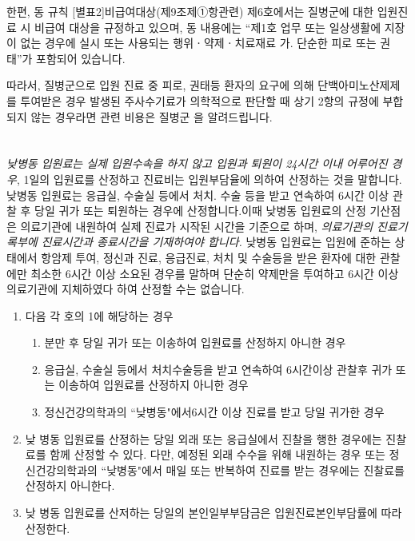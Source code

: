 {{한편, 동 규칙 [별표2]비급여대상(제9조제①항관련) 제6호에서는 질병군에 대한 입원진료 시 비급여 대상을 규정하고 있으며, 동 내용에는 “제1호 업무 또는 일상생활에 지장이 없는 경우에 실시 또는 사용되는 행위ㆍ약제ㆍ치료재료 가. 단순한 피로 또는 권태”가 포함되어 있습니다.

따라서, 질병군으로 입원 진료 중 피로, 권태등 환자의 요구에 의해 단백아미노산제제를 투여받은 경우 발생된 주사수기료가 의학적으로 판단할 때 상기 2항의 규정에 부합되지 않는 경우라면 관련 비용은 질병군 을 알려드립니다.}

\clearpage

\section{}
\emph{낮병동 입원료는 실제 입원수속을 하지 않고 입원과 퇴원이 24시간 이내 어루어진 경우}, 1일의 입원료를 산정하고 진료비는 입원부담율에 의하여 산정하는 것을 말합니다.
낮병동 입원료는 응급실, 수술실 등에서 처치. 수술 등을 받고 연속하여 6시간 이상 관찰 후 당일 귀가 또는 퇴원하는 경우에 산정합니다.이때 낮병동 입원료의 산정 기산점은 의료기관에 내원하여 실제 진료가 시작된 시간을 기준으로 하며, \emph{의료기관의 진료기록부에 진료시간과 종료시간을 기재하여야 합니다.}
낮병동 입원료는 입원에 준하는 상태에서 항암제 투여, 정신과 진료, 응급진료, 처치 및 수술등을 받은 환자에 대한 관찰에만 최소한 6시간 이상 소요된 경우를 말하며 단순히 약제만을 투여하고 6시간 이상 의료기관에 지체하였다 하여 산정할 수는 없습니다.
\begin{enumerate}[(가)]\tightlist
\item 다음 각 호의 1에 해당하는 경우
	\begin{mdframed}[linecolor=blue,middlelinewidth=2]	
	\begin{enumerate}\tightlist
	\item 분만 후 당일 귀가 또는 이송하여 입원료를 산정하지 아니한 경우
	\item 응급실, 수술실 등에서 처치\cntrdot{}수술등을 받고 연속하여 6시간이상 관찰후 귀가 또는 이송하여 입원료를 산정하지 아니한 경우
	\item 정신건강의학과의 ``낮병동"에서6시간 이상 진료를 받고 당일 귀가한 경우
	\end{enumerate}
	\end{mdframed}
\item 낮 병동 입원료를 산정하는 당일 외래 또는 응급실에서 진찰을 행한 경우에는 진찰료를 함께 산정할 수 있다. 다만, 예정된 외래 수수을 위해 내원하는 경우 또는 정신건강의학과의 ``낮병동"에서 매일 또는 반복하여 진료를 받는 경우에는 진찰료를 산정하지 아니한다.
\item 낮 병동 입원료를 산저하는 당일의 본인일부부담금은 입원진료본인부담률에 따라 산정한다.
\end{enumerate}

}
